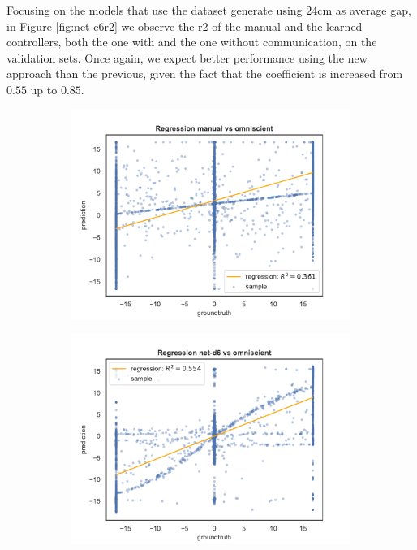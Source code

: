 Focusing on the models that use the dataset generate using $24$\gls{cm} as 
average gap, in Figure \ref{fig:net-c6r2} we observe the \gls{r2} of the manual 
and the learned controllers, both the one with and the one without 
communication, on the validation sets.
Once again, we expect better performance using the new approach than the 
previous, given the fact that the coefficient is increased from $0.55$ up to $0.85$.
\begin{figure}[!htb]
	\begin{center}
		\begin{subfigure}[h]{0.49\textwidth}
			\includegraphics[width=\textwidth]{contents/images/net-d6/regression-manualvsomniscient}%
		\end{subfigure}
		\hfill\vspace{-0.5cm}
		\begin{subfigure}[h]{0.49\textwidth}
			\includegraphics[width=\textwidth]{contents/images/net-d6/regression-net-d6-vs-omniscient}%

\end{subfigure}
\end{center}
\end{figure}
